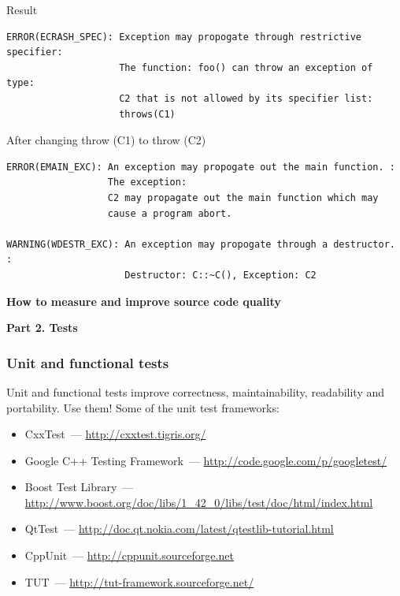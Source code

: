 \documentclass{beamer}
\begin{document}
\begin{frame}[fragile]
\begin{exampleblock}{Result}
\begin{Verbatim}[fontsize=\footnotesize]
ERROR(ECRASH_SPEC): Exception may propogate through restrictive specifier:
                    The function: foo() can throw an exception of type: 
                    C2 that is not allowed by its specifier list: 
                    throws(C1)
\end{Verbatim}
\end{exampleblock}
\begin{exampleblock}{After changing throw (C1) to throw (C2)}
\begin{Verbatim}[fontsize=\footnotesize]
ERROR(EMAIN_EXC): An exception may propogate out the main function. :
                  The exception: 
                  C2 may propagate out the main function which may 
                  cause a program abort.

WARNING(WDESTR_EXC): An exception may propogate through a destructor. :
                     Destructor: C::~C(), Exception: C2
\end{Verbatim}
\end{exampleblock}
\end{frame}

\begin{frame}
\begin{block}{\begin{center}\Large\textbf{How to measure and improve source code quality}\end{center}}
\begin{center}
\textbf{Part 2. Tests}
\end{center}
\end{block}
\end{frame}

\begin{frame}
\frametitle{Unit and functional tests}
Unit and functional tests improve correctness, maintainability, readability and portability. Use them! Some of the unit test frameworks:
\begin{itemize}
\item CxxTest~--- \url{http://cxxtest.tigris.org/}
\item Google C++ Testing Framework~--- \url{http://code.google.com/p/googletest/}
\item Boost Test Library~--- \url{http://www.boost.org/doc/libs/1_42_0/libs/test/doc/html/index.html}
\item QtTest~--- \url{http://doc.qt.nokia.com/latest/qtestlib-tutorial.html}
\item CppUnit~--- \url{http://cppunit.sourceforge.net}
\item TUT~--- \url{http://tut-framework.sourceforge.net/}
\end{itemize}
\end{frame}
\end{document}
